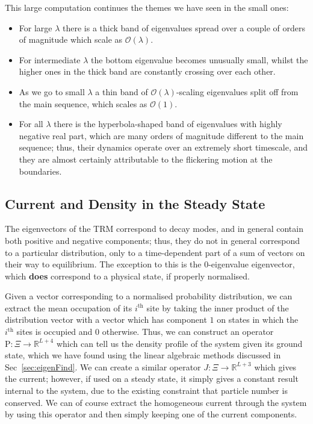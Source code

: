This large computation continues the themes we have seen in the small ones:
\begin{itemize}
 \item For large $\lambda$ there is a thick band of eigenvalues spread over a couple
 of orders of magnitude which scale as $\mathcal{O}(\lambda)$.
 \item For intermediate $\lambda$ the bottom eigenvalue becomes unusually small, whilst
 the higher ones in the thick band are constantly crossing over each other.
 \item As we go to small $\lambda$ a thin band of $\mathcal{O}(\lambda)$-scaling
 eigenvalues split off from the main sequence, which scales as $\mathcal{O}(1)$.
 \item For all $\lambda$ there is the hyperbola-shaped band of eigenvalues with highly
 negative real part, which are many orders of magnitude different to the main sequence;
 thus, their dynamics operate over an extremely short timescale, and they are almost
 certainly attributable to the flickering motion at the boundaries.
\end{itemize}



\subsection{Current and Density in the Steady State} \label{sec:TRMDensityCurrent}
The eigenvectors of the TRM correspond to decay modes, and in general contain both 
positive and negative components; thus, they do not in general correspond to a
particular distribution, only to a time-dependent part of a sum of vectors on their
way to equilibrium. The exception to this is the $0$-eigenvalue eigenvector, which
\textbf{does} correspond to a physical state, if properly normalised.

Given a vector corresponding to a normalised probability distribution, we can extract
the mean occupation of its $i^\mathrm{th}$ site by taking the inner product of the
distribution vector with a vector which has component $1$ on states in which the
$i^\mathrm{th}$ sites is occupied and $0$ otherwise. Thus, we can construct an operator
$\mathrm{P} : \Xi \rightarrow \mathbb{R}^{L+4}$ which can tell us the density profile of
the system given its ground state, which we have found using the linear algebraic
methods discussed in Sec~\ref{sec:eigenFind}. We can create a similar operator
$J : \Xi \rightarrow \mathbb{R}^{L+3}$ which gives the current; however, if used on a 
steady state, it simply gives a constant result internal to the system, due to the
existing constraint that particle number is conserved. We can of course extract
the homogeneous current through the system by using this operator and then simply
keeping one of the current components.

